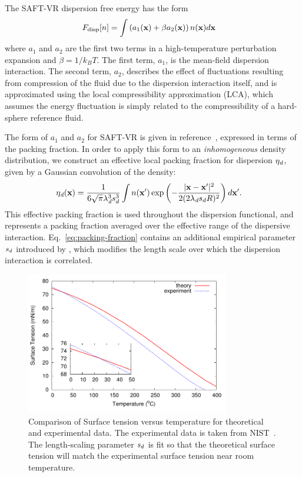 The SAFT-VR dispersion free energy has the form~\cite{gil-villegas-1997-SAFT-VR}
\begin{align}
  F_\text{disp}[n] &= \int \left(a_1(\textbf{x}) + \beta a_2(\textbf{x})\right)n(\textbf{x})d\textbf{x}
  \label{eq:dispersion-term}
\end{align}
where $a_1$ and $a_2$ are the first two terms in a high-temperature
perturbation expansion and $\beta=1/k_BT$.  The first term, $a_1$, is 
the mean-field dispersion interaction. The second term, $a_2$, describes the
effect of fluctuations resulting from compression of the fluid due
to the dispersion interaction itself, and is approximated
using the local compressibility approximation (LCA), which
assumes the energy fluctuation is simply related to the
compressibility of a hard-sphere reference fluid\cite{barker1976liquid}.

The form of $a_1$ and $a_2$ for SAFT-VR is given in
reference~\cite{gil-villegas-1997-SAFT-VR}, expressed in terms
of the packing fraction.  In order to apply this form to an
\emph{inhomogeneous} density distribution, we construct an effective local
packing fraction for dispersion $\eta_\textit{d}$, given by a Gaussian
convolution of the density:
\begin{align}
  \eta_\textit{d}(\textbf{x}) &= \frac{1}{6\sqrt{\pi} \lambda_\textit{d}^3s_d^3}
  \int n(\textbf{x}')\exp\left({-\frac{|\textbf{x}-\textbf{x}'|^2}{2(2 \lambda_\textit{d}
      s_d R)^2}}\right)d\textbf{x}'.\label{eq:packing-fraction}
\end{align}
This effective packing fraction is used throughout the dispersion
functional, and represents a packing fraction averaged over the
effective range of the dispersive interaction.
Eq.~\ref{eq:packing-fraction} contains an additional empirical
parameter $s_d$ introduced by \hughesetal, which modifies the
length scale over which the dispersion interaction is correlated.

\begin{figure}
\begin{center}
\includegraphics[width=3.5in]{figs/surface-tension}
\end{center}
\caption{Comparison of Surface tension versus temperature for
  theoretical and experimental data. The experimental data is taken
  from NIST~\cite{nistwater}.  The length-scaling parameter $s_d$
  is fit so that the theoretical surface tension will match the
  experimental surface tension near room temperature.}
\label{fig:surface-tension}
\end{figure}

